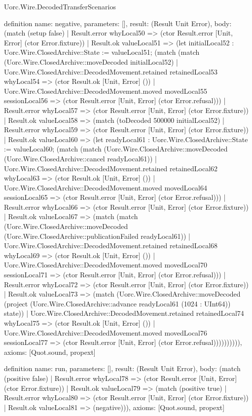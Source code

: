 \begin{lexlean}{Uorc.Wire.DecodedTransferScenarios}
\begin{semanticmodule}
definition{
  name: negative,
  parameters: [],
  result: (Result Unit Error),
  body: (match (setup false)
    | Result.error whyLocal50 => (ctor Result.error [Unit, Error] (ctor Error.fixture))
    | Result.ok valueLocal51 => (let initialLocal52 : Uorc.Wire.ClosedArchive::State := valueLocal51; (match (match (Uorc.Wire.ClosedArchive::moveDecoded initialLocal52)
        | Uorc.Wire.ClosedArchive::DecodedMovement.retained retainedLocal53 whyLocal54 => (ctor Result.ok [Unit, Error] ())
        | Uorc.Wire.ClosedArchive::DecodedMovement.moved movedLocal55 sessionLocal56 => (ctor Result.error [Unit, Error] (ctor Error.refusal)))
      | Result.error whyLocal57 => (ctor Result.error [Unit, Error] (ctor Error.fixture))
      | Result.ok valueLocal58 => (match (toDecoded 500000 initialLocal52)
        | Result.error whyLocal59 => (ctor Result.error [Unit, Error] (ctor Error.fixture))
        | Result.ok valueLocal60 => (let readyLocal61 : Uorc.Wire.ClosedArchive::State := valueLocal60; (match (match (Uorc.Wire.ClosedArchive::moveDecoded (Uorc.Wire.ClosedArchive::cancel readyLocal61))
            | Uorc.Wire.ClosedArchive::DecodedMovement.retained retainedLocal62 whyLocal63 => (ctor Result.ok [Unit, Error] ())
            | Uorc.Wire.ClosedArchive::DecodedMovement.moved movedLocal64 sessionLocal65 => (ctor Result.error [Unit, Error] (ctor Error.refusal)))
          | Result.error whyLocal66 => (ctor Result.error [Unit, Error] (ctor Error.fixture))
          | Result.ok valueLocal67 => (match (match (Uorc.Wire.ClosedArchive::moveDecoded (Uorc.Wire.ClosedArchive::publicationFailed readyLocal61))
              | Uorc.Wire.ClosedArchive::DecodedMovement.retained retainedLocal68 whyLocal69 => (ctor Result.ok [Unit, Error] ())
              | Uorc.Wire.ClosedArchive::DecodedMovement.moved movedLocal70 sessionLocal71 => (ctor Result.error [Unit, Error] (ctor Error.refusal)))
            | Result.error whyLocal72 => (ctor Result.error [Unit, Error] (ctor Error.fixture))
            | Result.ok valueLocal73 => (match (Uorc.Wire.ClosedArchive::moveDecoded (project (Uorc.Wire.ClosedArchive::advance readyLocal61 (1024 : UInt64)) state))
              | Uorc.Wire.ClosedArchive::DecodedMovement.retained retainedLocal74 whyLocal75 => (ctor Result.ok [Unit, Error] ())
              | Uorc.Wire.ClosedArchive::DecodedMovement.moved movedLocal76 sessionLocal77 => (ctor Result.error [Unit, Error] (ctor Error.refusal)))))))))),
  axioms: [Quot.sound, propext]
}

definition{
  name: run,
  parameters: [],
  result: (Result Unit Error),
  body: (match (positive false)
    | Result.error whyLocal78 => (ctor Result.error [Unit, Error] (ctor Error.fixture))
    | Result.ok valueLocal79 => (match (positive true)
      | Result.error whyLocal80 => (ctor Result.error [Unit, Error] (ctor Error.fixture))
      | Result.ok valueLocal81 => (negative))),
  axioms: [Quot.sound, propext]
}
\end{semanticmodule}
\end{lexlean}
